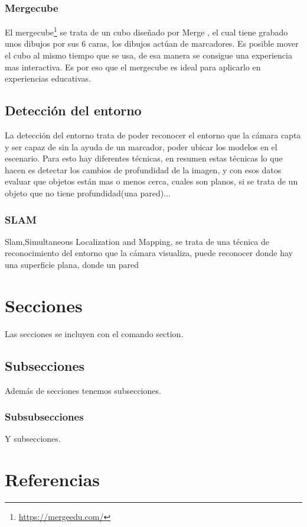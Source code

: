 	\subsubsection{Mergecube}
	El mergecube\footnote{\url{https://mergeedu.com/}} se trata de un cubo diseñado por Merge , el cual tiene grabado unos dibujos por sus 6 caras, los dibujos actúan de marcadores. Es posible mover el cubo al mismo tiempo que se usa, de esa manera se consigue una experiencia mas interactiva. Es por eso que el mergecube es ideal para aplicarlo en experiencias educativas.
	\subsection{Detección del entorno}
	La detección del entorno trata de poder reconocer el entorno que la cámara capta y ser capaz de sin la ayuda de un marcador, poder ubicar los modelos en el escenario.
	Para esto hay diferentes técnicas, en resumen estas técnicas lo que hacen es detectar los cambios de profundidad de la imagen, y con esos datos evaluar que objetos están mas o menos cerca, cuales son planos, si se trata de un objeto que no tiene profundidad(una pared)...
	\subsubsection{SLAM}
	Slam,Simultaneous Localization and Mapping, se trata de una técnica de reconocimiento del entorno que la cámara visualiza, puede reconocer donde hay una superficie plana, donde un pared
	
	
	
\section{Secciones}

Las secciones se incluyen con el comando section.

\subsection{Subsecciones}

Además de secciones tenemos subsecciones.

\subsubsection{Subsubsecciones}

Y subsecciones. 


\section{Referencias}

